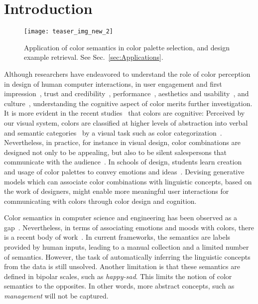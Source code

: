 \documentclass[prodmode,acmtochi]{acmsmall}
\begin{document}
\maketitle

\section{Introduction}
\label{sec:Introduction}

\begin{figure}[h!tb]
  \centering
  \texttt{[image: teaser\_img\_new\_2]}
  \caption{Application of color semantics in color palette selection, and design example retrieval. See Sec.~\ref{sec:Applications}.}
  \label{teaser_img}
\end{figure}


Although researchers have endeavored to understand the role of color perception in design of human computer interactions, in user engagement and first impression~\cite{lindgaard2006attention,reinecke2013predicting}, trust and credibility~\cite{lindgaard2011exploration,pengnate2013multimethod}, performance~\cite{moshagen2009blessing,sonderegger2010influence}, aesthetics and usability~\cite{lavie2004assessing,hassenzahl2004interplay}, and culture~\cite{cyr2010colour,reinecke2011improving,reinecke2014}, understanding the cognitive aspect of color merits further investigation.
It is more evident in the recent studies~\cite{derefeldt2004cognitive,skorupski2011colour} that colors are cognitive: Perceived by
our visual system, colors are classified at higher levels of
abstraction into verbal and semantic
categories~\cite{humphreys1989visual,barsalou1999perceptual} by a visual
task such as color categorization~\cite{derefeldt2004cognitive}. Nevertheless, in practice, for instance in visual design, color combinations are designed not only to be
appealing, but also to be silent salespersons that communicate with the
audience~\cite{eisemann2000pantone,frascara2004communication,newark2007graphic,samara2007design}.
In schools of design, students learn creation and usage of color
palettes to convey emotions and
ideas~\cite{whitfield1982design,ou2012cross}.
Devising generative models which can associate color combinations with linguistic concepts, based on the work of designers, might enable more meaningful user interactions for communicating with colors through color design and cognition.


Color semantics in computer science and engineering has been observed as a
gap~\cite{smeulders2000content,sethi2001mining,mojsilovic2001capturing,liu2007survey}.
Nevertheless, in terms of associating emotions and moods with colors, there is a recent body of work~\cite{csurka2010learning,solli2010color,murray2012toward}. In current frameworks, the semantics are labels provided by human inputs, leading to a manual collection and a limited number of semantics. However, the task of automatically inferring the linguistic concepts from the data is still unsolved. Another limitation is that these semantics are defined in bipolar scales, such as \emph{happy-sad}. This limits the notion of color semantics to the opposites. In other words, more abstract concepts, such as \emph{management} will not be captured.
\end{document}
